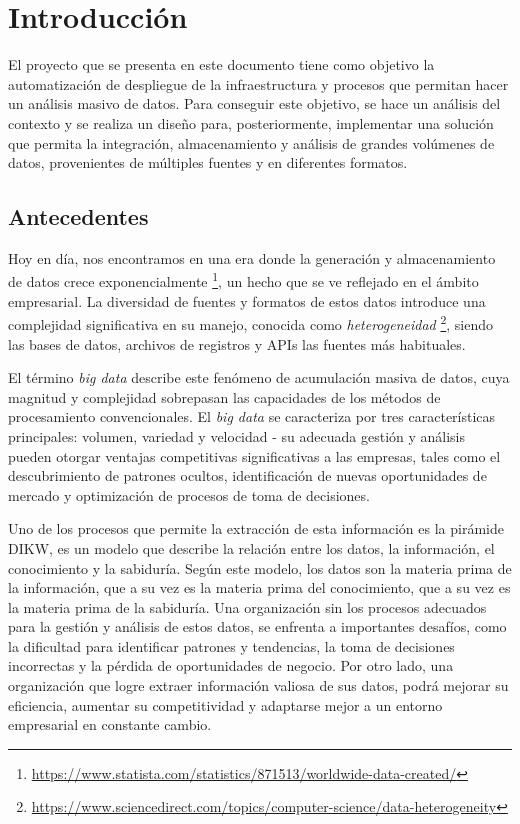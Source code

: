 \chapter{Introducción}\label{chap:intro}
El proyecto que se presenta en este documento tiene como objetivo la
automatización de despliegue de la infraestructura y procesos que permitan hacer
un análisis masivo de datos. Para conseguir este objetivo, se hace un
análisis del contexto y se realiza un diseño para, posteriormente, implementar
una solución que permita la integración, almacenamiento y análisis de grandes
volúmenes de datos, provenientes de múltiples fuentes y en diferentes formatos.

\section{Antecedentes}\label{sec:antecedentes}
Hoy en día, nos encontramos en una era donde la generación y almacenamiento de
datos crece exponencialmente \footnote{
	\url{https://www.statista.com/statistics/871513/worldwide-data-created/}
}, un hecho que se ve reflejado en el ámbito empresarial. La diversidad de
fuentes y formatos de estos datos introduce una complejidad significativa en su
manejo, conocida como \textit{heterogeneidad} \footnote{
	\url{https://www.sciencedirect.com/topics/computer-science/data-heterogeneity}
}, siendo las bases de datos, archivos de registros y APIs las fuentes más
habituales.

El término \textit{big data} describe este fenómeno de acumulación masiva de
datos, cuya magnitud y complejidad sobrepasan las capacidades de los métodos de
procesamiento convencionales. El \textit{big data} se caracteriza por tres
características principales: volumen, variedad y velocidad - su adecuada gestión
y análisis pueden otorgar ventajas competitivas significativas a las empresas,
tales como el descubrimiento de patrones ocultos, identificación de nuevas
oportunidades de mercado y optimización de procesos de toma de decisiones.

Uno de los procesos que permite la extracción de esta información es la pirámide
DIKW, \cite{enwiki:1211227190} es un modelo que describe la relación entre los
datos, la información, el conocimiento y la sabiduría. Según este modelo, los
datos son la materia prima de la información, que a su vez es la materia prima
del conocimiento, que a su vez es la materia prima de la sabiduría. Una
organización sin los procesos adecuados para la gestión y análisis de estos
datos, se enfrenta a importantes desafíos, como la dificultad para identificar
patrones y tendencias, la toma de decisiones incorrectas y la pérdida de
oportunidades de negocio. Por otro lado, una organización que logre extraer
información valiosa de sus datos, podrá mejorar su eficiencia, aumentar su
competitividad y adaptarse mejor a un entorno empresarial en constante cambio.

